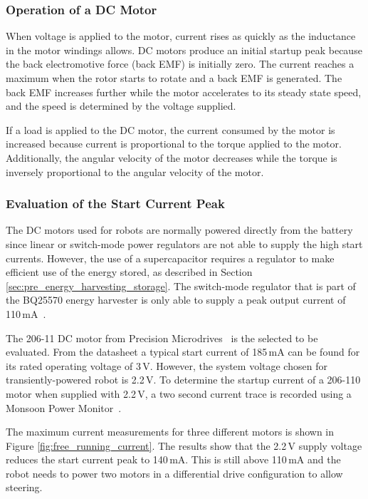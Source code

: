 \subsubsection{Operation of a DC Motor}

When voltage is applied to the motor, current rises as quickly as the inductance in the motor windings allows.
DC motors produce an initial startup peak because the back electromotive force (back EMF) is initially zero.
The current reaches a maximum when the rotor starts to rotate and a back EMF is generated.
The back EMF increases further while the motor accelerates to its steady state speed, and the speed is determined by the voltage supplied.

If a load is applied to the DC motor, the current consumed by the motor is increased because current is proportional to the torque applied to the motor.
Additionally, the angular velocity of the motor decreases while the torque is inversely proportional to the angular velocity of the motor.

\subsubsection{Evaluation of the Start Current Peak}
The DC motors used for robots are normally powered directly from the battery since linear or switch-mode power regulators are not able to supply the high start currents.
However, the use of a supercapacitor requires a regulator to make efficient use of the energy stored, as described in Section \ref{sec:pre_energy_harvesting_storage}.
The switch-mode regulator that is part of the BQ25570 energy harvester is only able to supply a peak output current of 110\,mA~\cite{bq25570_2017}.

The 206-11 DC motor from Precision Microdrives~\cite{gearmotor_206-110_2017} is the selected to be evaluated.
From the datasheet a typical start current of 185\,mA can be found for its rated operating voltage of 3\,V.
However, the system voltage chosen for transiently-powered robot is 2.2\,V.
To determine the startup current of a 206-110 motor when supplied with 2.2\,V, a two second current trace is recorded using a Monsoon Power Monitor~\cite{monsoon_powermonitor_2017}.

The maximum current measurements for three different motors is shown in Figure \ref{fig:free_running_current}.
The results show that the 2.2\,V supply voltage reduces the start current peak to 140\,mA.
This is still above 110\,mA and the robot needs to power two motors in a differential drive configuration to allow steering.

